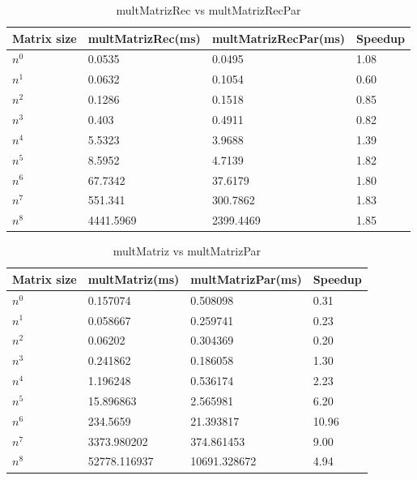 \documentclass[12pt, a4paper]{article}
\begin{document}
\begin{table}[h]
    \centering
    \begin{tabular}{ | m{4cm} | m{4cm} | m{4cm} | m{3cm} | }
    \hline
    Matrix size & multMatrizRec(ms) & multMatrizRecPar(ms) & Speedup \\ 
    \hline
    $n^0$ & 0.0535 & 0.0495 & 1.08 \\
    $n^1$ & 0.0632 & 0.1054 & 0.60 \\
    $n^2$ & 0.1286 & 0.1518 & 0.85 \\
    $n^3$ & 0.403 & 0.4911 & 0.82 \\
    $n^4$ & 5.5323 & 3.9688 & 1.39 \\
    $n^5$ & 8.5952 & 4.7139 & 1.82 \\
    $n^6$ & 67.7342 & 37.6179 & 1.80 \\
    $n^7$ & 551.341 & 300.7862 & 1.83 \\
    $n^8$ & 4441.5969 & 2399.4469 & 1.85 \\
    \hline
    \end{tabular}
    \caption{multMatrizRec vs multMatrizRecPar}
    \label{table:matrix_comparison}
\end{table}


\begin{table}[h]
    \centering
    \begin{tabular}{ | m{2cm} | m{3cm} | m{4cm} | m{3cm} | }
    \hline
    Matrix size & multMatriz(ms) & multMatrizPar(ms) & Speedup \\ 
    \hline
    $n^0$ & 0.157074 & 0.508098 & 0.31 \\
    $n^1$ & 0.058667 & 0.259741 & 0.23 \\
    $n^2$ & 0.06202 & 0.304369 & 0.20 \\
    $n^3$ & 0.241862 & 0.186058 & 1.30 \\
    $n^4$ & 1.196248 & 0.536174 & 2.23 \\
    $n^5$ & 15.896863 & 2.565981 & 6.20 \\
    $n^6$ & 234.5659 & 21.393817 & 10.96 \\
    $n^7$ & 3373.980202 & 374.861453 & 9.00 \\
    $n^8$ & 52778.116937 & 10691.328672 & 4.94 \\
    \hline
    \end{tabular}
    \caption{multMatriz vs multMatrizPar}
    \label{table:matrix_performance}
\end{table}
\end{document}
